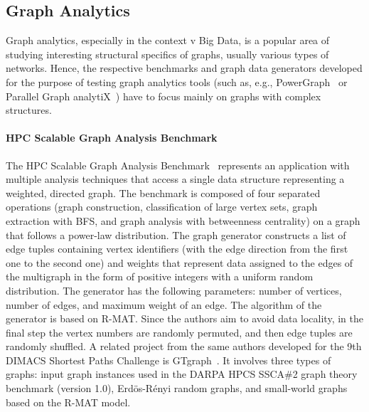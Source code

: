 \subsection{Graph Analytics}
\label{sec:generators_analytics}

Graph analytics, especially in the context v Big Data, is a popular area of studying interesting structural specifics of graphs, usually various types of networks.  Hence, the respective benchmarks and graph data generators developed for the purpose of testing graph analytics tools (such as, e.g.,  PowerGraph~\cite{Gonzalez:2012:PDG:2387880.2387883} or Parallel Graph analytiX~\cite{Sevenich:2016:UDL:3007263.3007265}) have to focus mainly on graphs with complex structures.

\paragraph{HPC Scalable Graph Analysis Benchmark} The HPC Scalable Graph
Analysis Benchmark~\cite{HPCgraph,Bader:2005:DIH:2099301.2099360} represents an
application with multiple analysis techniques that access a single data
structure representing a weighted, directed graph. The benchmark is composed of
four separated operations (graph construction, classification of large vertex
sets, graph extraction with BFS, and graph analysis with betweenness centrality)
on a graph that follows a power-law distribution. The graph generator constructs a list of edge tuples containing vertex
identifiers (with the edge direction from the first one to the second one) and
weights that represent data assigned to the edges of the multigraph in the form
of positive integers with a uniform random distribution. The generator has the
following parameters: number of vertices, number of edges, and maximum weight of
an edge. The algorithm of the generator is based on R-MAT. Since the authors aim
to avoid data locality, in the final step the vertex numbers are randomly
permuted, and then edge tuples are randomly shuffled. A related project from the same authors developed for the 9th DIMACS Shortest
Paths Challenge is GTgraph~\cite{GTgraph}. It involves three types of graphs:
input graph instances used in the DARPA HPCS SSCA\#2 graph theory benchmark
(version 1.0), Erd\"{o}s-R\'{e}nyi random graphs, and small-world graphs based
on the R-MAT model.

